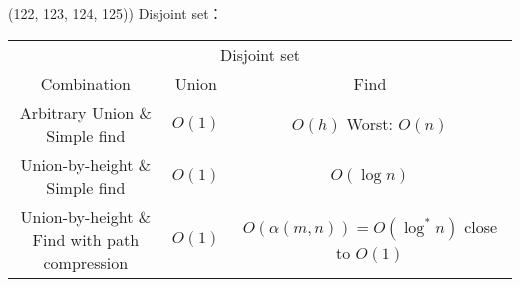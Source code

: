 \item \begin{theorem}{(122, 123, 124, 125))} Disjoint set： 
    \begin{table}[H]
        \centering
        \begin{tabular}{|c|c|c|}
            \hline
            \multicolumn{3}{|c|}{Disjoint set} \\
            \Xhline{3\arrayrulewidth}
            Combination & Union & Find \\
            \Xhline{2\arrayrulewidth}
            \makecell{Arbitrary Union \&\\Simple find} & $O(1)$ & \makecell{$O(h)$\\Worst: $O(n)$} \\
            \hline
            \makecell{Union-by-height \&\\Simple find} & $O(1)$ & $O(\log n)$ \\
            \hline
            \makecell{Union-by-height \&\\Find with path compression} & $O(1)$ & \makecell{$O(\alpha(m, n)) = O(\log^* n)$\\close to $O(1)$} \\
            \hline
        \end{tabular}
    \end{table}
\end{theorem}

